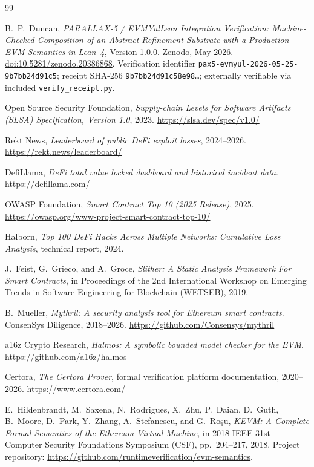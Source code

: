 \documentclass[11pt,a4paper]{article}
\begin{document}
\begin{thebibliography}{99}

B.~P.\ Duncan,
\emph{PARALLAX-5 / EVMYulLean Integration Verification: Machine-Checked Composition of an Abstract Refinement Substrate with a Production EVM Semantics in Lean~4}, Version 1.0.0.
Zenodo, May 2026.
\href{https://doi.org/10.5281/zenodo.20386868}{doi:10.5281/zenodo.20386868}.
Verification identifier \texttt{pax5-evmyul-2026-05-25-9b7bb24d91c5}; receipt SHA-256 \texttt{9b7bb24d91c58e98\ldots}; externally verifiable via included \texttt{verify\_receipt.py}.

{Open Source Security Foundation},
\emph{Supply-chain Levels for Software Artifacts (SLSA) Specification, Version 1.0}, 2023.
\url{https://slsa.dev/spec/v1.0/}

Rekt News,
\emph{Leaderboard of public DeFi exploit losses}, 2024--2026.
\url{https://rekt.news/leaderboard/}

DefiLlama,
\emph{DeFi total value locked dashboard and historical incident data}.
\url{https://defillama.com/}

{OWASP Foundation},
\emph{Smart Contract Top 10 (2025 Release)}, 2025.
\url{https://owasp.org/www-project-smart-contract-top-10/}

Halborn,
\emph{Top 100 DeFi Hacks Across Multiple Networks: Cumulative Loss Analysis}, technical report, 2024.

J.~Feist, G.~Grieco, and A.~Groce,
\emph{Slither: A Static Analysis Framework For Smart Contracts}, in Proceedings of the 2nd International Workshop on Emerging Trends in Software Engineering for Blockchain (WETSEB), 2019.

B.~Mueller,
\emph{Mythril: A security analysis tool for Ethereum smart contracts}. ConsenSys Diligence, 2018--2026.
\url{https://github.com/Consensys/mythril}

a16z Crypto Research,
\emph{Halmos: A symbolic bounded model checker for the EVM}.
\url{https://github.com/a16z/halmos}

Certora,
\emph{The Certora Prover}, formal verification platform documentation, 2020--2026.
\url{https://www.certora.com/}

E.~Hildenbrandt, M.~Saxena, N.~Rodrigues, X.~Zhu, P.~Daian, D.~Guth, B.~Moore, D.~Park, Y.~Zhang, A.~Stefanescu, and G.~Ro\c{s}u,
\emph{KEVM: A Complete Formal Semantics of the Ethereum Virtual Machine}, in 2018 IEEE 31st Computer Security Foundations Symposium (CSF), pp.~204--217, 2018.
Project repository: \url{https://github.com/runtimeverification/evm-semantics}.


\end{thebibliography}
\end{document}
